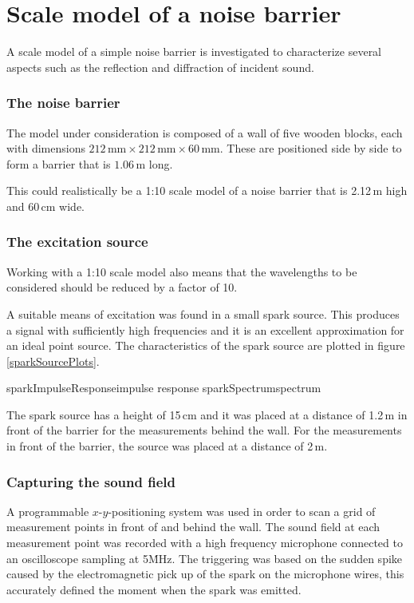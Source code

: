 \section{Scale model of a noise barrier \label{sectScalemodel}}
A scale model of a simple noise barrier is investigated to characterize several aspects such as the reflection and diffraction of incident sound.

\subsubsection*{The noise barrier}
The model under consideration is composed of a wall of five wooden blocks, each with dimensions $212\,\mathrm{mm} \times 212\,\mathrm{mm} \times 60\,\mathrm{mm}$. These are positioned side by side to form a barrier that is $1.06\,\mathrm{m}$ long.

This could realistically be a 1:10 scale model of a noise barrier that is 2.12\,m high and 60\,cm wide. 

\subsubsection*{The excitation source}
Working with a 1:10 scale model also means that the wavelengths to be considered should be reduced by a factor of 10.

A suitable means of excitation was found in a small spark source. This produces a signal with sufficiently high frequencies and it is an excellent approximation for an ideal point source. The characteristics of the spark source are plotted in figure \ref{sparkSourcePlots}.

	{sparkImpulseResponse}{impulse response}
	{sparkSpectrum}{spectrum}

The spark source has a height of 15\,cm and it was placed at a distance of 1.2\,m in front of the barrier for the measurements behind the wall. For the measurements in front of the barrier, the source was placed at a distance of 2\,m.



\subsubsection*{Capturing the sound field}
A programmable $x$-$y$-positioning system was used in order to scan a grid of measurement points in front of and behind the wall. The sound field at each measurement point was recorded with a high frequency microphone connected to an oscilloscope sampling at 5\.MHz. The triggering was based on the sudden spike caused by the electromagnetic pick up of the spark on the microphone wires, this accurately defined the moment when the spark was emitted.

